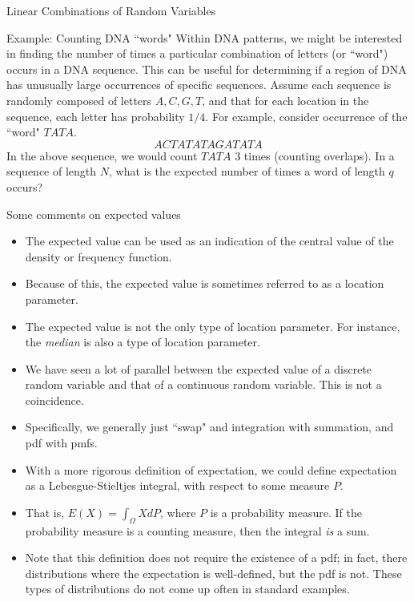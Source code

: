 \begin{frame}[allowframebreaks]{Linear Combinations of Random Variables}
\begin{exampleblock}{Example: Counting DNA ``words"}
  Within DNA patterns, we might be interested in finding the number of times a particular combination of letters (or ``word") occurs in a DNA sequence. This can be useful for determining if a region of DNA has unusually large occurrences of specific sequences. Assume each sequence is randomly composed of letters $A, C, G, T$, and that for each location in the sequence, each letter has probability $1/4$. For example, consider occurrence of the ``word" $TATA$.
  $$
  ACTATATAGATATA
  $$
  In the above sequence, we would count $TATA$ 3 times (counting overlaps). In a sequence of length $N$, what is the expected number of times a word of length $q$ occurs?
\end{exampleblock}

\end{frame}

\begin{frame}[allowframebreaks]{Some comments on expected values}
  \begin{itemize}
    \item The expected value can be used as an indication of the central value of the density or frequency function.
    \item Because of this, the expected value is sometimes referred to as a \alert{location parameter}.
    \item The expected value is not the only type of location parameter. For instance, the \emph{median} is also a type of location parameter.
    \item We have seen a lot of parallel between the expected value of a discrete random variable and that of a continuous random variable. This is not a coincidence. 
    \item Specifically, we generally just ``swap" and integration with summation, and pdf with pmfs.
    \item With a more rigorous definition of expectation, we could define expectation as a \alert{Lebesgue-Stieltjes} integral, with respect to some measure $P$.
    \item That is, $E(X) = \int_\Omega XdP$, where $P$ is a probability measure. If the probability measure is a counting measure, then the integral \emph{is} a sum. 
    \item Note that this definition does not require the existence of a pdf; in fact, there distributions where the expectation is well-defined, but the pdf is not. These types of distributions do not come up often in standard examples. 
  \end{itemize}
\end{frame}

